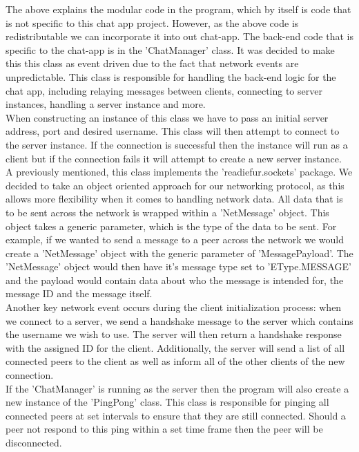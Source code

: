 \documentclass{COMPXXXX}
\begin{document}
\normalsize \textrm {The above explains the modular code in the program, which by itself is code that is not specific to this chat app project. However, as the above code is redistributable we can incorporate it into out chat-app. The back-end code that is specific to the chat-app is in the 'ChatManager' class. It was decided to make this this class as event driven due to the fact that network events are unpredictable. This class is responsible for handling the back-end logic for the chat app, including relaying messages between clients, connecting to server instances, handling a server instance and more.\\
When constructing an instance of this class we have to pass an initial server address, port and desired username. This class will then attempt to connect to the server instance. If the connection is successful then the instance will run as a client but if the connection fails it will attempt to create a new server instance.\\
A previously mentioned, this class implements the 'readiefur.sockets' package. We decided to take an object oriented approach for our networking protocol, as this allows more flexibility when it comes to handling network data.
All data that is to be sent across the network is wrapped within a 'NetMessage' object. This object takes a generic parameter, which is the type of the data to be sent. For example, if we wanted to send a message to a peer across the network we would create a 'NetMessage' object with the generic parameter of 'MessagePayload'. The 'NetMessage' object would then have it's message type set to 'EType.MESSAGE' and the payload would contain data about who the message is intended for, the message ID and the message itself.\\
Another key network event occurs during the client initialization process: when we connect to a server, we send a handshake message to the server which contains the username we wish to use. The server will then return a handshake response with the assigned ID for the client. Additionally, the server will send a list of all connected peers to the client as well as inform all of the other clients of the new connection.\\
If the 'ChatManager' is running as the server then the program will also create a new instance of the 'PingPong' class. This class is responsible for pinging all connected peers at set intervals to ensure that they are still connected. Should a peer not respond to this ping within a set time frame then the peer will be disconnected.\\
}
\end{document}
